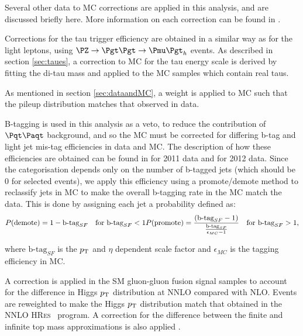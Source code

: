 Several other data to \ac{MC} corrections are applied in this analysis, and are
discussed briefly here. More information on each correction can be found in
\cite{HIG-13-004}. 

Corrections for the tau trigger efficiency are 
obtained in a similar way as for the light leptons, using $\PZ\to\Pgt\Pgt\to\Pmu\Pgt_{h}$ events. As described in
section \ref{sec:taues}, a correction to \ac{MC} for the tau energy
scale is derived by fitting the di-tau mass and applied to the \ac{MC} samples
which contain real taus.

As mentioned in section \ref{sec:dataandMC}, a weight is applied to \ac{MC} such
that the pileup distribution matches that observed in data.

B-tagging is used in this analysis as a veto, to reduce the contribution of
$\ttbar$ background, and so the \ac{MC} must be corrected for differing b-tag
and light jet mis-tag efficiencies in data and \ac{MC}. The description of how
these efficiencies are obtained can be found in \cite{CMS-PAS-BTV-11-004} for
2011 data and \cite{CMS-PAS-BTV-13-001} for 2012 data. Since the categorisation 
depends only on the number of b-tagged jets (which should be 0 for selected events), 
we apply this efficiency using a promote/demote method to reclassify jets in \ac{MC} 
to make the overall b-tagging rate in the \ac{MC} match the data. This is done
by assigning each jet a probability defined as:
\begin{equation}
P(\text{demote})  = 1 - \text{b-tag}_{SF} \quad \text{for } \text{b-tag}_{SF} < 1 \\
P(\text{promote}) = \frac{\left(\text{b-tag}_{SF} -
1\right)}{\frac{\text{b-tag}_{SF}}{\epsilon_{MC}-1} } \quad \text{for } \text{b-tag}_{SF} > 1 ,
\end{equation}

where $\text{b-tag}_{SF}$ is the $p_{\mathrm{T}}$ and $\eta$ dependent scale factor and
$\epsilon_{MC}$ is the tagging efficiency in \ac{MC}.

A correction is applied in the \ac{SM} gluon-gluon fusion signal
samples to account for the difference in Higgs $p_{\mathrm{T}}$ distribution at \ac{NNLO}
compared with \ac{NLO}. Events are reweighted to make the Higgs $p_{\mathrm{T}}$
distribution match that obtained in the \ac{NNLO} \textsc{HRes}~\cite{deFlorian:2012mx} program. 
A correction for the difference between the finite and infinite top
mass approximations is also applied \cite{Grazzini:2013mca}.


